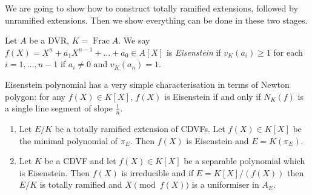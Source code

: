 \documentclass[a4paper]{article}
\DeclareMathOperator{\Frac}{Frac}
\begin{document}
We are going to show how to construct totally ramified extensions, followed by unramified extensions. Then we show everything can be done in these two stages.

\begin{definition}
  Let \(A\) be a DVR, \(K = \Frac A\). We say \(f(X) = X^n + a_1 X^{n - 1} + \dots + a_0 \in A[X]\) is \emph{Eisenstein} if \(v_K(a_i) \geq 1\)  for each \(i = 1, \dots, n - 1\) if \(a_i \neq 0\) and \(v_K(a_n) = 1\).
\end{definition}

Eisenstein polynomial has a very simple characterisation in terms of Newton polygon: for any \(f(X) \in K[X]\), \(f(X)\) is Eisenstein if and only if \(N_K(f)\) is a single line segment of slope \(\frac{1}{n}\).

\begin{proposition}\leavevmode
  \begin{enumerate}
  \item Let \(E/K\) be a totally ramified extension of CDVFs. Let \(f(X) \in K[X]\) be the minimal polynomial of \(\pi_E\). Then \(f(X)\) is Eisenstein and \(E = K(\pi_E)\).
  \item Let \(K\) be a CDVF and let \(f(X) \in K[X]\) be a separable polynomial which is Eisenstein. Then \(f(X)\) is irreducible and if \(E = K[X]/(f(X))\) then \(E/K\) is totally ramified and \(X \pmod{f(X)}\) is a uniformiser in \(A_E\).
  \end{enumerate}
\end{proposition}
\end{document}
